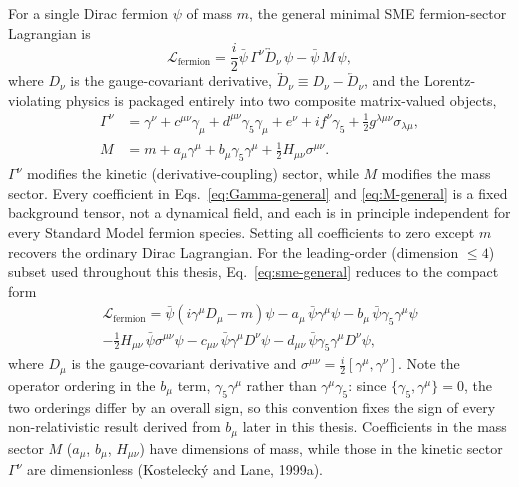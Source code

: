 For a single Dirac fermion $\psi$ of mass $m$, the general minimal SME
fermion-sector Lagrangian is
\begin{equation}
  \mathcal L_{\mathrm{fermion}}
  = \frac{i}{2}\bar\psi\,\Gamma^\nu\overleftrightarrow{D}_\nu\,\psi
  - \bar\psi\,M\,\psi, \label{eq:sme-general}
\end{equation}
where $D_\nu$ is the gauge-covariant derivative,
$\overleftrightarrow{D}_\nu \equiv D_\nu - \overleftarrow{D}_\nu$, and the
Lorentz-violating physics is packaged entirely into two composite
matrix-valued objects,
\begin{align}
  \Gamma^\nu &= \gamma^\nu + c^{\mu\nu}\gamma_\mu + d^{\mu\nu}\gamma_5\gamma_\mu
               + e^\nu + if^\nu\gamma_5 + \tfrac12 g^{\lambda\mu\nu}\sigma_{\lambda\mu},
               \label{eq:Gamma-general} \\
  M &= m + a_\mu\gamma^\mu + b_\mu\gamma_5\gamma^\mu + \tfrac12 H_{\mu\nu}\sigma^{\mu\nu}.
      \label{eq:M-general}
\end{align}
$\Gamma^\nu$ modifies the kinetic (derivative-coupling) sector, while $M$
modifies the mass sector. Every coefficient in Eqs.~\eqref{eq:Gamma-general}
and \eqref{eq:M-general} is a fixed background tensor, not a dynamical
field, and each is in principle independent for every Standard Model fermion
species. Setting all coefficients to zero except $m$ recovers the ordinary
Dirac Lagrangian. For the leading-order (dimension $\leq4$) subset used
throughout this thesis, Eq.~\eqref{eq:sme-general} reduces to the compact
form
\begin{multline}
  \mathcal L_{\mathrm{fermion}}
  = \bar\psi\left(i\gamma^\mu D_\mu - m\right)\psi
  - a_\mu\,\bar\psi\gamma^\mu\psi
  - b_\mu\,\bar\psi\gamma_5\gamma^\mu\psi \\
  - \tfrac12 H_{\mu\nu}\,\bar\psi\sigma^{\mu\nu}\psi
  - c_{\mu\nu}\,\bar\psi\gamma^\mu D^\nu\psi
  - d_{\mu\nu}\,\bar\psi\gamma_5\gamma^\mu D^\nu\psi,
  \label{eq:sme-minimal}
\end{multline}
where $D_\mu$ is the gauge-covariant derivative and
$\sigma^{\mu\nu}=\tfrac{i}{2}[\gamma^\mu,\gamma^\nu]$. Note the operator
ordering in the $b_\mu$ term, $\gamma_5\gamma^\mu$ rather than
$\gamma^\mu\gamma_5$: since $\{\gamma_5,\gamma^\mu\}=0$, the two orderings
differ by an overall sign, so this convention fixes the sign of every
non-relativistic result derived from $b_\mu$ later in this thesis. Coefficients in the mass sector $M$ ($a_\mu$, $b_\mu$,
$H_{\mu\nu}$) have dimensions of mass, while those in the kinetic sector
$\Gamma^\nu$ are dimensionless (Kosteleck\'{y} and Lane, 1999a).

